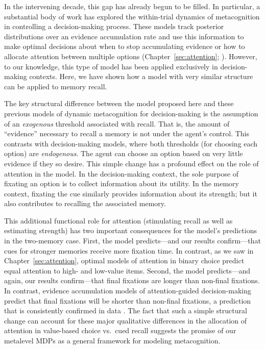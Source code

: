 In the intervening decade, this gap has already begun to be filled. In particular, a substantial body of work has explored the within-trial dynamics of metacognition in controlling a decision-making process. These models track posterior distributions over an evidence accumulation rate and use this information to make optimal decisions about when to stop accumulating evidence \citep{drugowitsch2012cost,woodford2014stochastic,bitzer2014perceptual,fudenberg2018speed,tajima2019optimal} or how to allocate attention between multiple options (Chapter~\ref{sec:attention}; \citealp{jang2021optimal}). However, to our knowledge, this type of model has been applied exclusively in decision-making contexts. Here, we have shown how a model with very similar structure can be applied to memory recall. 

The key structural difference between the model proposed here and these previous models of dynamic metacognition for decision-making is the assumption of an \emph{exogenous} threshold associated with recall. That is, the amount of ``evidence'' necessary to recall a memory is not under the agent's control. This contrasts with decision-making models, where both thresholds (for choosing each option) are \emph{endogenous}. The agent can choose an option based on very little evidence if they so desire. This simple change has a profound effect on the role of attention in the model. In the decision-making context, the sole purpose of fixating an option is to collect information about its utility. In the memory context, fixating the cue similarly provides information about its strength; but it also contributes to recalling the associated memory. 

This additional functional role for attention (stimulating recall as well as estimating strength) has two important consequences for the model's predictions in the two-memory case. First, the model predicts---and our results confirm---that cues for stronger memories receive more fixation time. In contrast, as we saw in Chapter~\ref{sec:attention}, optimal models of attention in binary choice predict equal attention to high- and low-value items.
Second, the model predicts---and again, our results confirm---that final fixations are longer than non-final fixations. In contrast, evidence accumulation models of attention-guided decision-making predict that final fixations will be shorter than non-final fixations, a prediction that is consistently confirmed in data \citep{krajbich2010visual,krajbich2011multialternative,tavares2017attentional}. The fact that such a simple structural change can account for these major qualitative differences in the allocation of attention in value-based choice vs.~cued recall suggests the promise of our metalevel MDPs as a general framework for modeling metacognition.

